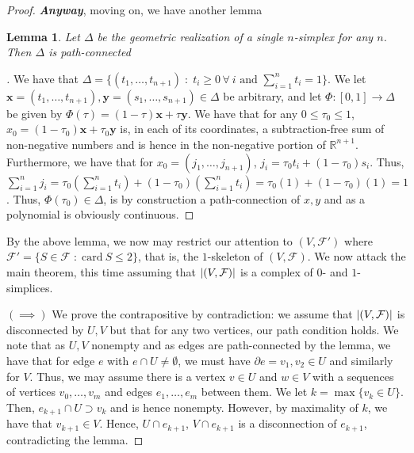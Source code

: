 \documentclass[english]{article}
\renewcommand\vec{\mathbf}
\DeclarePairedDelimiter\abs{\lvert}{\rvert}%
\newcommand{\RR}{\mathbb{R}}
\newenvironment{subproof}[1][\proofname]{%
	\renewcommand{\qedsymbol}{$\blacksquare$}%
	\begin{proof}[#1]%
	}{%
	\end{proof}%
}
\newtheorem{lemma}[theorem]{Lemma}
\theoremstyle{remark}
\theoremstyle{definition}
\newcommand{\card}{\mathrm{card}}
\newcommand{\Fcal}{\mathcal{F}}
\begin{document}
\begin{proof}
\textbf{\emph{Anyway}}, moving on, we have another lemma\textellipsis
\begin{lemma}
	Let $\Delta$ be the geometric realization of a single $n$-simplex  for any $n$. Then $\Delta$ is path-connected
\end{lemma}
\begin{subproof}
	We have that $\Delta=\{(t_1,\hdots,t_{n+1})\;:\; t_i\geq0\,\forall\: i \text{ and } \sum_{i=1}^n t_i=1\}$. We let $\vec{x}=(t_1,\hdots,t_{n+1}),\vec{y}=(s_1,\hdots,s_{n+1})\in \Delta$ be arbitrary, and let $\Phi:[0,1]\to \Delta$ be given by $\Phi(\tau)=(1-\tau)\vec{x}+\tau\vec{y}$. We have that for any $0\leq \tau_0\leq 1$, $x_0=(1-\tau_0)\vec{x} +\tau_0\vec{y}$ is, in each of its coordinates, a subtraction-free sum of non-negative numbers and is hence in the non-negative portion of $\RR^{n+1}$. Furthermore, we have that for $x_0=(j_1,\hdots,j_{n+1})$, $j_i=\tau_0 t_i +(1-\tau_0)s_i$. Thus, $\sum_{i=1}^n j_i=\tau_0\left(\sum_{i=1}^nt_i\right)+(1-\tau_0)\left(\sum_{i=1}^nt_i\right)=\tau_0(1)+(1-\tau_0)(1)=1$. Thus, $\Phi(\tau_0)\in \Delta$, is by construction a path-connection of $x,y$ and as a polynomial is obviously continuous.
\end{subproof}
By the above lemma, we now may restrict our attention to $(V,\Fcal')$ where $\Fcal'=\{S\in \Fcal\;:\; \card\:{S}\leq 2\}$, that is, the $1$-skeleton of $(V,\Fcal)$. 
We now attack the main theorem, this time assuming that $\abs{(V,\Fcal)}$ is a complex of $0$- and $1$-simplices.

$(\implies)$ We prove the contrapositive by contradiction: we assume that $\abs{(V,\Fcal)}$ is disconnected by $U,V$ but that for any two vertices, our path condition holds. We note that as $U,V$ nonempty and as edges are path-connected by the lemma, we have that for edge $e$ with $e\cap U\neq \emptyset$, we must have $\partial e=v_1,v_2\in U$ and similarly for $V$. Thus, we may assume there is a vertex $v\in U$ and $w\in V$ with a sequences of vertices $v_0,\hdots,v_m$ and edges $e_1,\hdots,e_m$ between them. We let $k=\max\{v_k\in U\}$. Then, $e_{k+1}\cap U\supset v_k$ and is hence nonempty. However, by maximality of $k$, we have that $v_{k+1}\in V$. Hence, $U\cap e_{k+1}$, $V\cap e_{k+1}$ is a disconnection of $e_{k+1}$, contradicting the lemma.


\end{proof}
\end{document}
